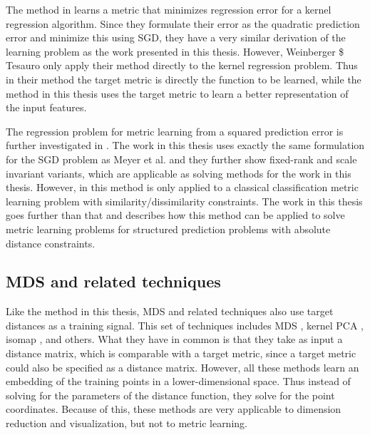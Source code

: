 The method in \cite{weinberger2007metric} learns a metric that minimizes regression error for a kernel regression algorithm. Since they formulate their error as the quadratic prediction error and minimize this using \ac{SGD}, they have a very similar derivation of the learning problem as the work presented in this thesis. However, Weinberger \$ Tesauro only apply their method directly to the kernel regression problem. Thus in their method the target metric is directly the function to be learned, while the method in this thesis uses the target metric to learn a better representation of the input features. 

The regression problem for metric learning from a squared prediction error is further investigated in \cite{meyer2011regression}. The work in this thesis uses exactly the same formulation for the \ac{SGD} problem as Meyer et al. and they further show fixed-rank and scale invariant variants, which are applicable as solving methods for the work in this thesis. However, in \cite{meyer2011regression} this method is only applied to a classical classification metric learning problem with similarity/dissimilarity constraints. The work in this thesis goes further than that and describes how this method can be applied to solve metric learning problems for structured prediction problems with absolute distance constraints.


\subsection{MDS and related techniques}

Like the method in this thesis, \acf{MDS} and related techniques also use target distances as a training signal. This set of techniques includes \ac{MDS} \cite{venna2006local, chen2009local, chen2013stress}, kernel PCA \cite{scholkopf1997kernel}, isomap \cite{tenenbaum2000global}, and others. What they have in common is that they take as input a distance matrix, which is comparable with a target metric, since a target metric could also be specified as a distance matrix. However, all these methods learn an embedding of the training points in a lower-dimensional space. Thus instead of solving for the parameters of the distance function, they solve for the point coordinates. Because of this, these methods are very applicable to dimension reduction and visualization, but not to metric learning.

